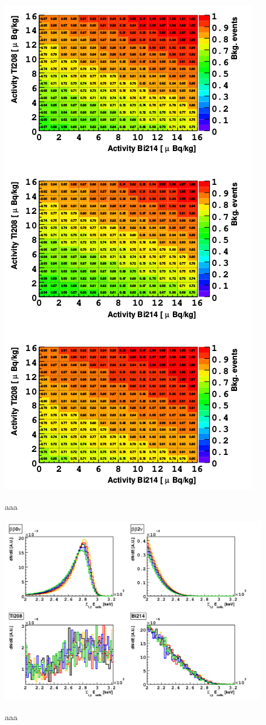 \documentclass[main.tex]{subfiles}
\begin{document}
\begin{figure}[h!]
\centering
\includegraphics[scale=0.3]{pictures/Chap4/Nbkg_3designs.png}
\label{Nbkg_3designs.png}
\caption{aaa}
\end{figure}


\begin{figure}[h!]
\centering
\includegraphics[scale=0.3]{pictures/Chap4/PVAspectra.png}
\label{PVAspectra.png}
\caption{aaa}
\end{figure}
\end{document}
